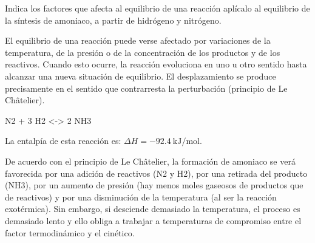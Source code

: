 \begin{exercise} %
    Indica los factores que afecta al equilibrio de una reacción aplícalo al equilibrio de la síntesis de amoniaco, a partir de hidrógeno y nitrógeno.
    \begin{solu}
        El equilibrio de una reacción puede verse afectado por variaciones de la temperatura, de la presión
        o de la concentración de los productos y de los reactivos. Cuando esto ocurre, la reacción evoluciona
        en uno u otro sentido hasta alcanzar una nueva situación de equilibrio. El desplazamiento
        se produce precisamente en el sentido que contrarresta la perturbación (principio de Le Châtelier).
        \begin{reaction*}
            N2 \gas{} + 3 H2 \gas{} <-> 2 NH3 \gas{}
        \end{reaction*}
        La entalpía de esta reacción es: \( \Delta H = \qty{-92.4}{\kilo\joule\per\mole} \).

        De acuerdo con el principio de Le Châtelier, la formación de amoniaco se verá favorecida por una
        adición de reactivos (N2 y H2), por una retirada del producto (NH3), por un aumento de presión (hay
        menos moles gaseosos de productos que de reactivos) y por una disminución de la temperatura
        (al ser la reacción exotérmica). Sin embargo, si desciende demasiado la temperatura, el proceso es
        demasiado lento y ello obliga a trabajar a temperaturas
        de compromiso entre el factor termodinámico
        y el cinético.
    \end{solu}
\end{exercise}


